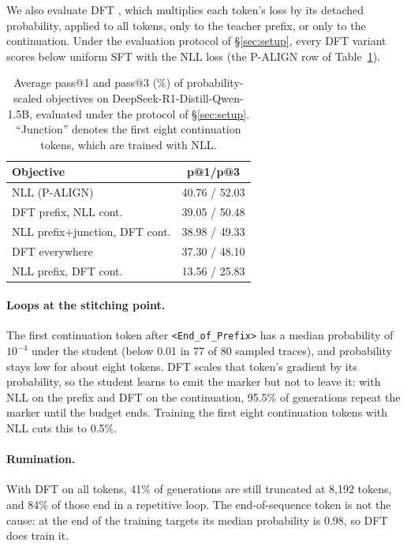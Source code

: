 \documentclass[11pt]{article}
\newcommand{\eop}{\texttt{<End\_of\_Prefix>}}
\begin{document}
We also evaluate DFT \citep{wu2026dft}, which multiplies each token's loss by its detached probability, applied to all tokens, only to the teacher prefix, or only to the continuation.
Under the evaluation protocol of \S\ref{sec:setup}, every DFT variant scores below uniform SFT with the NLL loss (the P-ALIGN row of Table~\ref{tab:dft}).
\begin{table}[h]
  \centering
  \small
  \setlength{\tabcolsep}{3pt}
  \begin{tabular}{lc}
    \toprule
    Objective & p@1/p@3 \\
    \midrule
    NLL (P-ALIGN) & 40.76 / 52.03 \\
    DFT prefix, NLL cont. & 39.05 / 50.48 \\
    NLL prefix+junction, DFT cont. & 38.98 / 49.33 \\
    DFT everywhere & 37.30 / 48.10 \\
    NLL prefix, DFT cont. & 13.56 / 25.83 \\
    \bottomrule
  \end{tabular}
  \caption{Average pass@1 and pass@3 (\%)
of probability-scaled objectives on
DeepSeek-R1-Distill-Qwen-1.5B,
evaluated under the protocol of
\S\ref{sec:setup}. ``Junction'' denotes the
first eight continuation tokens,
which are trained with NLL.}
  \label{tab:dft}
\end{table}

\paragraph{Loops at the stitching point.}
The first continuation token after \eop{} has a median probability of $10^{-4}$ under the student (below 0.01 in 77 of 80 sampled traces), and probability stays low for about eight tokens.
DFT scales that token's gradient by its probability, so the student learns to emit the marker but not to leave it: with NLL on the prefix and DFT on the continuation, 95.5\% of generations repeat the marker until the budget ends.
Training the first eight continuation tokens with NLL cuts this to 0.5\%.

\paragraph{Rumination.}
With DFT on all tokens, 41\% of generations are still truncated at 8,192 tokens, and 84\% of those end in a repetitive loop.
The end-of-sequence token is not the cause: at the end of the training targets its median probability is 0.98, so DFT does train it.
\end{document}
